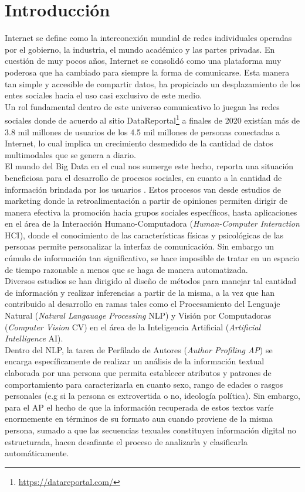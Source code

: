 \chapter*{Introducción}
Internet se define como la interconexión mundial de redes individuales operadas por el gobierno, la industria, el mundo académico y las partes privadas. En cuestión de muy pocos años, Internet se consolidó como una plataforma muy poderosa que ha cambiado para siempre la forma de comunicarse.  Esta manera tan simple y accesible de compartir datos, ha propiciado un desplazamiento de los entes sociales hacia el uso casi exclusivo de este medio.
\\
Un rol fundamental dentro de este universo comunicativo lo juegan las redes sociales donde de acuerdo al sitio DataReportal\footnote{\url{https://datareportal.com/}} a finales de 2020 existían más de 3.8 mil millones de usuarios de los 4.5 mil millones de personas conectadas a Internet, lo cual implica un crecimiento desmedido de la cantidad de datos multimodales que se genera a diario.
\\
El mundo del Big Data \citep{Riahi2018BigDA} en el cual nos sumerge este hecho, reporta una situación beneficiosa para el desarrollo de procesos sociales, en cuanto a la cantidad de información brindada por los usuarios . 
Estos procesos van desde estudios de marketing donde la retroalimentación a partir de opiniones permiten dirigir de manera efectiva la promoción hacia grupos sociales específicos, hasta aplicaciones en el área de la Interacción Humano-Computadora (\textit{Human-Computer Interaction }HCI), donde el conocimiento de las características físicas y psicológicas de las personas permite personalizar la interfaz de comunicación. Sin embargo un cúmulo de información tan significativo, se hace imposible de tratar en un espacio de tiempo razonable a menos que se haga de manera automatizada.
\\
Diversos estudios se han dirigido al diseño de métodos para manejar tal cantidad de información y realizar inferencias a partir de la misma, a la vez que han contribuido al desarrollo en ramas tales como el Procesamiento del Lenguaje Natural (\textit{Natural Langauage Processing} NLP) y Visión por Computadoras (\textit{Computer Vision} CV) en el área de la Inteligencia Artificial (\textit{Artificial Intelligence} AI).
\\ 
Dentro del NLP, la tarea de Perfilado de Autores (\textit{Author Profiling AP}) \citep{Rosso2019,article} se encarga específicamente de realizar un análisis de la información textual elaborada por una persona que permita establecer atributos y patrones de comportamiento para caracterizarla en cuanto sexo, rango de edades o rasgos personales (e.g si la persona es extrovertida o no, ideología política). Sin embargo, para el AP el hecho de que la información recuperada de estos textos varíe enormemente en términos de su formato aun cuando proviene de la misma persona, sumado a que las secuencias texuales constituyen información digital no estructurada, hacen desafiante el proceso de analizarla y clasificarla automáticamente. 
